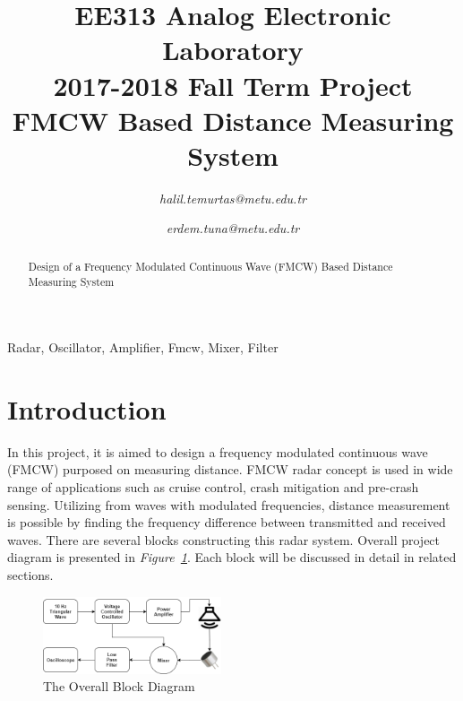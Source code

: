 \documentclass[paper]{IEEEtran}
\begin{document}
\title{EE313 Analog Electronic Laboratory\\
2017-2018 Fall Term Project \\
FMCW Based Distance Measuring System
}


\author{

\textit{halil.temurtas@metu.edu.tr}

\and

\textit{erdem.tuna@metu.edu.tr}

}

\maketitle

\begin{abstract}

Design of a Frequency Modulated Continuous Wave (FMCW) Based Distance Measuring System

\end{abstract}

\begin{IEEEkeywords}
Radar, Oscillator, Amplifier, Fmcw, Mixer, Filter
\end{IEEEkeywords}

\section{Introduction}

In this project, it is aimed to design a frequency modulated continuous wave (FMCW) purposed on measuring distance. FMCW radar concept is used in wide range of applications such as cruise control, crash mitigation and pre-crash sensing\cite{b1}. Utilizing from waves with modulated frequencies, distance measurement is possible by finding the frequency difference between transmitted and received waves. There are several blocks constructing this radar system. Overall project diagram is presented in \textit{Figure~\ref{fig:diagram_Final}}. Each block will be discussed in detail in related sections.
\begin{figure}[h!]
	\setlength{\unitlength}{\textwidth}
	\center 
	\includegraphics[width=0.47\textwidth]{diagram_Final}
	\caption{\label{fig:diagram_Final}The Overall Block Diagram}
\end{figure}
\end{document}

